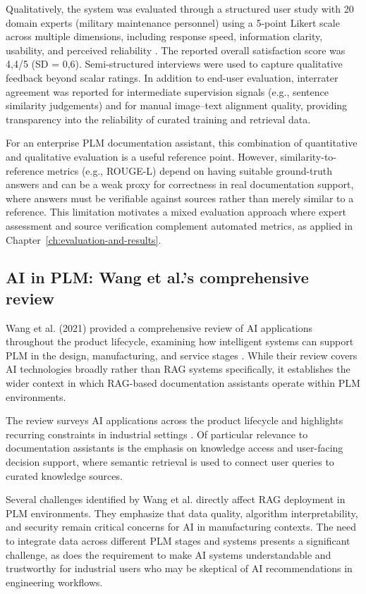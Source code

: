 Qualitatively, the system was evaluated through a structured user study with 20 domain experts (military maintenance personnel) using a 5-point Likert scale across multiple dimensions, including response speed, information clarity, usability, and perceived reliability \parencite{namLoRATunedMultimodalRAG2025}. The reported overall satisfaction score was 4,4/5 (SD = 0,6). Semi-structured interviews were used to capture qualitative feedback beyond scalar ratings. In addition to end-user evaluation, interrater agreement was reported for intermediate supervision signals (e.g., sentence similarity judgements) and for manual image--text alignment quality, providing transparency into the reliability of curated training and retrieval data.

For an enterprise PLM documentation assistant, this combination of quantitative and qualitative evaluation is a useful reference point. However, similarity-to-reference metrics (e.g., ROUGE-L) depend on having suitable ground-truth answers and can be a weak proxy for correctness in real documentation support, where answers must be verifiable against sources rather than merely similar to a reference. This limitation motivates a mixed evaluation approach where expert assessment and source verification complement automated metrics, as applied in Chapter~\ref{ch:evaluation-and-results}.

\subsection*{AI in PLM: Wang et al.'s comprehensive review}

Wang et al. (2021) provided a comprehensive review of AI applications throughout the product lifecycle, examining how intelligent systems can support PLM in the design, manufacturing, and service stages \parencite{wangArtificialIntelligenceProduct2021}. While their review covers AI technologies broadly rather than RAG systems specifically, it establishes the wider context in which RAG-based documentation assistants operate within PLM environments.

The review surveys AI applications across the product lifecycle and highlights recurring constraints in industrial settings \parencite{wangArtificialIntelligenceProduct2021}. Of particular relevance to documentation assistants is the emphasis on knowledge access and user-facing decision support, where semantic retrieval is used to connect user queries to curated knowledge sources.

Several challenges identified by Wang et al. directly affect RAG deployment in PLM environments. They emphasize that data quality, algorithm interpretability, and security remain critical concerns for AI in manufacturing contexts. The need to integrate data across different PLM stages and systems presents a significant challenge, as does the requirement to make AI systems understandable and trustworthy for industrial users who may be skeptical of AI recommendations in engineering workflows. \parencite{wangArtificialIntelligenceProduct2021}

